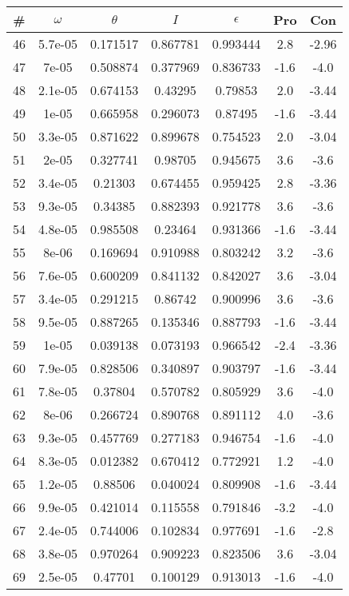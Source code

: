 \begin{table}
\begin{tabular}{c|c|c|c|c|c|c}
\# & $\omega$ & $\theta$ & $I$ & $\epsilon$ & Pro & Con\\
\hline
46 & 5.7e-05 & 0.171517 & 0.867781 & 0.993444 & 2.8 & -2.96\\
47 & 7e-05 & 0.508874 & 0.377969 & 0.836733 & -1.6 & -4.0\\
48 & 2.1e-05 & 0.674153 & 0.43295 & 0.79853 & 2.0 & -3.44\\
49 & 1e-05 & 0.665958 & 0.296073 & 0.87495 & -1.6 & -3.44\\
50 & 3.3e-05 & 0.871622 & 0.899678 & 0.754523 & 2.0 & -3.04\\
51 & 2e-05 & 0.327741 & 0.98705 & 0.945675 & 3.6 & -3.6\\
52 & 3.4e-05 & 0.21303 & 0.674455 & 0.959425 & 2.8 & -3.36\\
53 & 9.3e-05 & 0.34385 & 0.882393 & 0.921778 & 3.6 & -3.6\\
54 & 4.8e-05 & 0.985508 & 0.23464 & 0.931366 & -1.6 & -3.44\\
55 & 8e-06 & 0.169694 & 0.910988 & 0.803242 & 3.2 & -3.6\\
56 & 7.6e-05 & 0.600209 & 0.841132 & 0.842027 & 3.6 & -3.04\\
57 & 3.4e-05 & 0.291215 & 0.86742 & 0.900996 & 3.6 & -3.6\\
58 & 9.5e-05 & 0.887265 & 0.135346 & 0.887793 & -1.6 & -3.44\\
59 & 1e-05 & 0.039138 & 0.073193 & 0.966542 & -2.4 & -3.36\\
60 & 7.9e-05 & 0.828506 & 0.340897 & 0.903797 & -1.6 & -3.44\\
61 & 7.8e-05 & 0.37804 & 0.570782 & 0.805929 & 3.6 & -4.0\\
62 & 8e-06 & 0.266724 & 0.890768 & 0.891112 & 4.0 & -3.6\\
63 & 9.3e-05 & 0.457769 & 0.277183 & 0.946754 & -1.6 & -4.0\\
64 & 8.3e-05 & 0.012382 & 0.670412 & 0.772921 & 1.2 & -4.0\\
65 & 1.2e-05 & 0.88506 & 0.040024 & 0.809908 & -1.6 & -3.44\\
66 & 9.9e-05 & 0.421014 & 0.115558 & 0.791846 & -3.2 & -4.0\\
67 & 2.4e-05 & 0.744006 & 0.102834 & 0.977691 & -1.6 & -2.8\\
68 & 3.8e-05 & 0.970264 & 0.909223 & 0.823506 & 3.6 & -3.04\\
69 & 2.5e-05 & 0.47701 & 0.100129 & 0.913013 & -1.6 & -4.0\\

\end{tabular}
\end{table}
